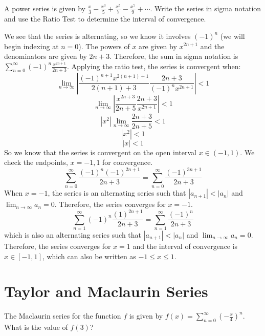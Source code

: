 \begin{Exercise} A power series is given by 
$\frac{x}{3} - \frac{x^3}{5} + \frac{x^5}{7} - \frac{x^7}{9} + \cdots$. Write 
the series in sigma notation and use the Ratio Test to determine the interval 
of convergence.
\end{Exercise}

\begin{Answer}[ref = radconv2]
We see that the series is alternating, so we know it involves $(-1)^n$ (we 
will begin indexing at $n = 0$). The powers of $x$ are given by $x^{2n+1}$ and 
the denominators are given by $2n + 3$. Therefore, the sum in sigma notation 
is $\sum_{n=0}^\infty (-1)^n \frac{x^{2n+1}}{2n+3}$. Applying the ratio test, 
the series is convergent when:
$$\lim_{n \to \infty} \left| \frac{(-1)^{n+1} x^{2(n+1)+1}}{2(n+1)+3} \frac{2n+
3}{(-1)^n x^{2n+1}} \right| < 1$$
$$\lim_{n \to \infty} \left| \frac{x^{2n+3}}{2n+5} \frac{2n+3}{x^{2n+1}} 
\right| < 1$$
$$\left| x^2 \right| \lim_{n \to \infty} \frac{2n+3}{2n+5} < 1$$
$$\left| x^2 \right| < 1$$
$$\left| x \right| < 1$$
So we know that the series is convergent on the open interval $x \in (-1, 1)$. 
We check the endpoints, $x = -1, 1$ for convergence. 
$$\sum_{n=0}^\infty \frac{(-1)^n (-1)^{2n+1}}{2n+3} = \sum_{n=0}^\infty \frac{
(-1)^{3n+1}}{2n+3}$$
When $x = -1$, the series is an alternating series such that $\left| a_{n+1} 
\right| < \left|a_n \right|$ and $\lim_{n \to \infty} a_n = 0$. Therefore, the 
series converges for $x = -1$.
$$\sum_{n=1}^\infty (-1)^n \frac{(1)^{2n+1}}{2n+3} = \sum_{n=1}^\infty \frac{
(-1)^n}{2n+3}$$
which is also an alternating series such that $\left| a_{n+1} \right| < \left| 
a_n \right|$ and $\lim_{n \to \infty} a_n = 0$. Therefore, the series 
converges for $x = 1$ and the interval of convergence is $x \in [-1, 1]$, 
which can also be written as $-1 \leq x \leq 1$. 
\end{Answer}

\section{Taylor and Maclaurin Series}

\begin{Exercise} The Maclaurin series for the 
function $f$ is given by $f(x) = \sum_{n=0}^\infty \left( -\frac{x}{4} \right)^
n$. What is the value of $f(3)$?
\end{Exercise}


